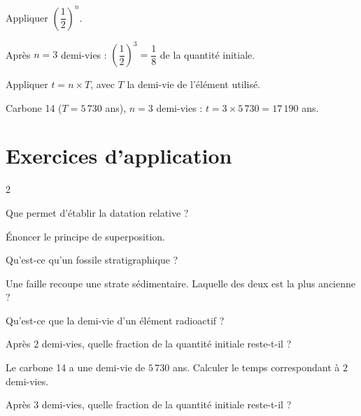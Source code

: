 Appliquer $\left(\dfrac12\right)^n$.
\begin{exemple}
Après $n=3$ demi-vies : $\left(\dfrac12\right)^3=\dfrac18$ de la quantité initiale.
\end{exemple}

Appliquer $t=n\times T$, avec $T$ la demi-vie de l'élément utilisé.
\begin{exemple}
Carbone 14 ($T=5\,730$ ans), $n=3$ demi-vies : $t=3\times5\,730=17\,190$ ans.
\end{exemple}

\section{Exercices d'application}
\begin{multicols}{2}

\exo{} Que permet d'établir la datation relative ?

\exo{} Énoncer le principe de superposition.

\exo{} Qu'est-ce qu'un fossile stratigraphique ?

\exo{} Une faille recoupe une strate sédimentaire. Laquelle des deux est la
plus ancienne ?

\exo{} Qu'est-ce que la demi-vie d'un élément radioactif ?

\exo{} Après $2$ demi-vies, quelle fraction de la quantité initiale reste-t-il ?

\exo{} Le carbone 14 a une demi-vie de $5\,730$ ans. Calculer le temps
correspondant à $2$ demi-vies.

\exo{} Après $3$ demi-vies, quelle fraction de la quantité initiale reste-t-il ?

\end{multicols}

